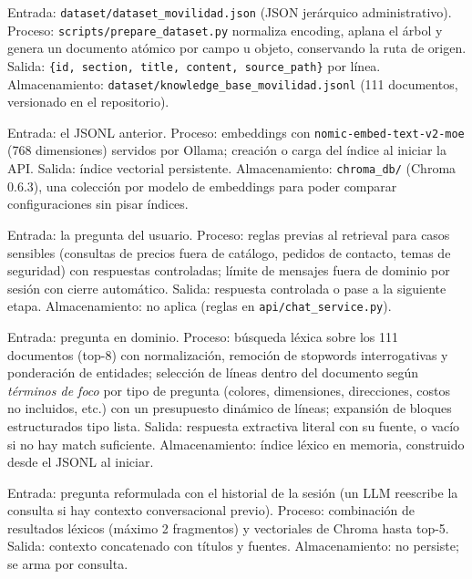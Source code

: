 \documentclass[11pt,a4paper]{article}
\newcommand{\code}[1]{\texttt{#1}}
\begin{document}
\begin{description}[style=nextline]
    \item[Ingesta y preprocesamiento.] Entrada:
    \code{dataset/dataset\_movilidad.json} (JSON jerárquico administrativo).
    Proceso: \code{scripts/prepare\_dataset.py} normaliza encoding, aplana el
    árbol y genera un documento atómico por campo u objeto, conservando la
    ruta de origen. Salida: \code{\{id, section, title, content,
    source\_path\}} por línea. Almacenamiento:
    \code{dataset/knowledge\_base\_movilidad.jsonl} (111 documentos,
    versionado en el repositorio).

    \item[Vectorización e indexado.] Entrada: el JSONL anterior. Proceso:
    embeddings con \code{nomic-embed-text-v2-moe} (768 dimensiones) servidos
    por Ollama; creación o carga del índice al iniciar la API. Salida: índice
    vectorial persistente. Almacenamiento: \code{chroma\_db/} (Chroma
    0.6.3), una colección por modelo de embeddings para poder comparar
    configuraciones sin pisar índices.

    \item[Guardrails.] Entrada: la pregunta del usuario. Proceso: reglas
    previas al retrieval para casos sensibles (consultas de precios fuera de
    catálogo, pedidos de contacto, temas de seguridad) con respuestas
    controladas; límite de mensajes fuera de dominio por sesión con cierre
    automático. Salida: respuesta controlada o pase a la siguiente etapa.
    Almacenamiento: no aplica (reglas en \code{api/chat\_service.py}).

    \item[Ruta extractiva.] Entrada: pregunta en dominio. Proceso: búsqueda
    léxica sobre los 111 documentos (top-8) con normalización, remoción de
    stopwords interrogativas y ponderación de entidades; selección de líneas
    dentro del documento según \emph{términos de foco} por tipo de pregunta
    (colores, dimensiones, direcciones, costos no incluidos, etc.) con un
    presupuesto dinámico de líneas; expansión de bloques estructurados tipo
    lista. Salida: respuesta extractiva literal con su fuente, o vacío si no
    hay match suficiente. Almacenamiento: índice léxico en memoria,
    construido desde el JSONL al iniciar.

    \item[Recuperación híbrida (ruta generativa).] Entrada: pregunta
    reformulada con el historial de la sesión (un LLM reescribe la consulta
    si hay contexto conversacional previo). Proceso: combinación de
    resultados léxicos (máximo 2 fragmentos) y vectoriales de Chroma hasta
    top-5. Salida: contexto concatenado con títulos y fuentes.
    Almacenamiento: no persiste; se arma por consulta.


\end{description}
\end{document}
